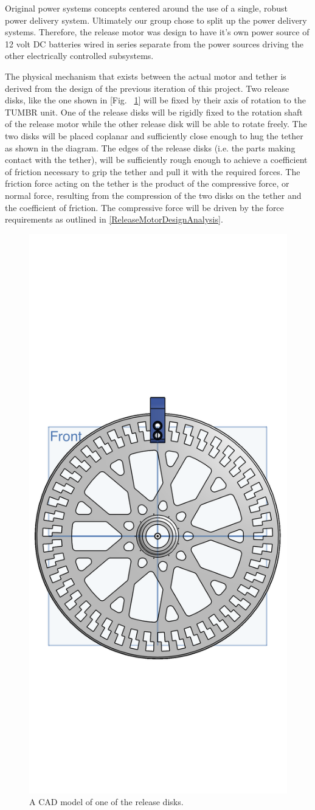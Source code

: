 Original power systems concepts centered around the use of a single, robust power delivery system. Ultimately our group chose to split up the power delivery systems. Therefore, the release motor was design to have it's own power source of 12 volt DC batteries wired in series separate from the power sources driving the other electrically controlled subsystems. 

The physical mechanism that exists between the actual motor and tether is derived from the design of the previous iteration of this project. Two release disks, like the one shown in [Fig. ~\ref{fig:ReleaseDisk1}] will be fixed by their axis of rotation to the TUMBR unit. One of the release disks will be rigidly fixed to the rotation shaft of the release motor while the other release disk will be able to rotate freely. The two disks will be placed coplanar and sufficiently close enough to hug the tether as shown in the diagram. The edges of the release disks (i.e. the parts making contact with the tether), will be sufficiently rough enough to achieve a coefficient of friction necessary to grip the tether and pull it with the required forces. The friction force acting on the tether is the product of the compressive force, or normal force, resulting from the compression of the two disks on the tether and the coefficient of friction. The compressive force will be driven by the force requirements as outlined in \ref{ReleaseMotorDesignAnalysis}.

\begin{figure}[H]
  \centering
  \includegraphics[width=.5\textwidth]{Figures/ReleaseDisk1.png}
  \caption{\label{fig:ReleaseDisk1}A CAD model of one of the release disks.}
\end{figure}

